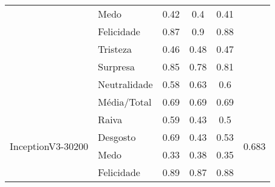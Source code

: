 \begin{table}[]
\begin{tabular}{llcccc}
                                            & Medo                  & 0.42                                  & 0.4                                    & 0.41                                  &                                       \\
                                            & Felicidade            & 0.87                                  & 0.9                                    & 0.88                                  &                                       \\
                                            & Tristeza              & 0.46                                  & 0.48                                   & 0.47                                  &                                       \\
                                            & Surpresa              & 0.85                                  & 0.78                                   & 0.81                                  &                                       \\
                                            & Neutralidade          & 0.58                                  & 0.63                                   & 0.6                                   &                                       \\
                                            & Média/Total           & 0.69                                  & 0.69                                   & 0.69                                  &                                       \\ \hline
\multirow{8}{*}{InceptionV3-30200}          & Raiva                 & 0.59                                  & 0.43                                   & 0.5                                   & \multirow{8}{*}{0.683}                \\
                                            & Desgosto              & 0.69                                  & 0.43                                   & 0.53                                  &                                       \\
                                            & Medo                  & 0.33                                  & 0.38                                   & 0.35                                  &                                       \\
                                            & Felicidade            & 0.89                                  & 0.87                                   & 0.88                                  &                                       \\

\end{tabular}
\end{table}
